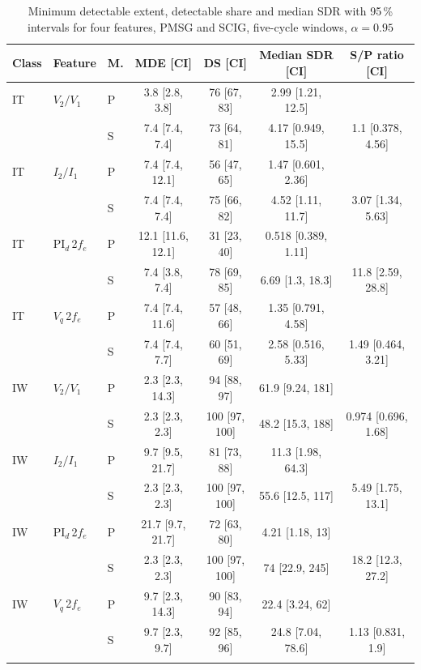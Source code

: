 \begin{table}[t]
\tabsize
\setlength{\tabcolsep}{2pt}
\caption{Minimum detectable extent, detectable share and median SDR with 95\,\% intervals for four features, PMSG and SCIG, five-cycle windows, $\alpha=0.95$}\label{tab:mde}
\begin{tabular}{@{}lllcccc@{}}
\toprule
Class & Feature & M. & MDE [CI] & DS [CI] & Median SDR [CI] & S/P ratio [CI] \\
\midrule
IT & $V_2/V_1$ & P & 3.8 [2.8, 3.8] & 76 [67, 83] & 2.99 [1.21, 12.5] & \\
 &  & S & 7.4 [7.4, 7.4] & 73 [64, 81] & 4.17 [0.949, 15.5] & 1.1 [0.378, 4.56] \\
IT & $I_2/I_1$ & P & 7.4 [7.4, 12.1] & 56 [47, 65] & 1.47 [0.601, 2.36] & \\
 &  & S & 7.4 [7.4, 7.4] & 75 [66, 82] & 4.52 [1.11, 11.7] & 3.07 [1.34, 5.63] \\
IT & PI$_d$\,2$f_e$ & P & 12.1 [11.6, 12.1] & 31 [23, 40] & 0.518 [0.389, 1.11] & \\
 &  & S & 7.4 [3.8, 7.4] & 78 [69, 85] & 6.69 [1.3, 18.3] & 11.8 [2.59, 28.8] \\
IT & $V_q$\,2$f_e$ & P & 7.4 [7.4, 11.6] & 57 [48, 66] & 1.35 [0.791, 4.58] & \\
 &  & S & 7.4 [7.4, 7.7] & 60 [51, 69] & 2.58 [0.516, 5.33] & 1.49 [0.464, 3.21] \\
IW & $V_2/V_1$ & P & 2.3 [2.3, 14.3] & 94 [88, 97] & 61.9 [9.24, 181] & \\
 &  & S & 2.3 [2.3, 2.3] & 100 [97, 100] & 48.2 [15.3, 188] & 0.974 [0.696, 1.68] \\
IW & $I_2/I_1$ & P & 9.7 [9.5, 21.7] & 81 [73, 88] & 11.3 [1.98, 64.3] & \\
 &  & S & 2.3 [2.3, 2.3] & 100 [97, 100] & 55.6 [12.5, 117] & 5.49 [1.75, 13.1] \\
IW & PI$_d$\,2$f_e$ & P & 21.7 [9.7, 21.7] & 72 [63, 80] & 4.21 [1.18, 13] & \\
 &  & S & 2.3 [2.3, 2.3] & 100 [97, 100] & 74 [22.9, 245] & 18.2 [12.3, 27.2] \\
IW & $V_q$\,2$f_e$ & P & 9.7 [2.3, 14.3] & 90 [83, 94] & 22.4 [3.24, 62] & \\
 &  & S & 9.7 [2.3, 9.7] & 92 [85, 96] & 24.8 [7.04, 78.6] & 1.13 [0.831, 1.9] \\
\botrule
\end{tabular}
\end{table}
